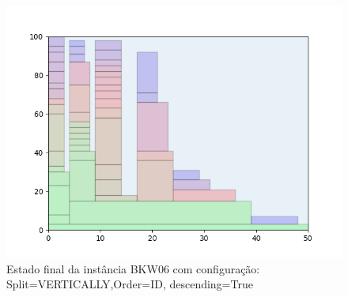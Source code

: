 \begin{figure}[H]
    \centering
    \caption[]{Estado final da instância BKW06 com configuração: Split=VERTICALLY,Order=ID, descending=True}
    \label{fig:bkw06-vertically-id-true}
    \includegraphics[scale=0.5]{output/figures/bkw/bkw06/vertically/id/true/00}
\end{figure}